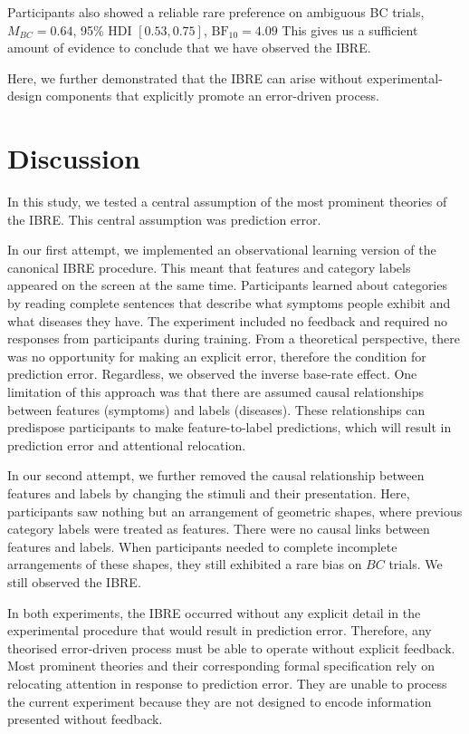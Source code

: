 \documentclass[10pt,letterpaper]{article}
\begin{document}
Participants also showed a reliable rare preference on ambiguous BC trials, $M_{BC} = 0.64$, 95\% HDI $[0.53, 0.75]$, $\mathrm{BF}_{10} = 4.09$
This gives us a sufficient amount of evidence to conclude that we have observed the IBRE.

Here, we further demonstrated that the IBRE can arise without experimental-design components that explicitly promote an error-driven process.

\section{Discussion}

In this study, we tested a central assumption of the most prominent theories of the IBRE.
This central assumption was prediction error.

In our first attempt, we implemented an observational learning version of the canonical IBRE procedure.
This meant that features and category labels appeared on the screen at the same time.
Participants learned about categories by reading complete sentences that describe what symptoms people exhibit and what diseases they have.
The experiment included no feedback and required no responses from participants during training.
From a theoretical perspective, there was no opportunity for making an explicit error, therefore the condition for prediction error.
Regardless, we observed the inverse base-rate effect.
One limitation of this approach was that there are assumed causal relationships between features (symptoms) and labels (diseases).
These relationships can predispose participants to make feature-to-label predictions, which will result in prediction error and attentional relocation.

In our second attempt, we further removed the causal relationship between features and labels by changing the stimuli and their presentation.
Here, participants saw nothing but an arrangement of geometric shapes, where previous category labels were treated as features.
There were no causal links between features and labels.
When participants needed to complete incomplete arrangements of these shapes, they still exhibited a rare bias on $BC$ trials.
We still observed the IBRE.

In both experiments, the IBRE occurred without any explicit detail in the experimental procedure that would result in prediction error.
Therefore, any theorised error-driven process must be able to operate without explicit feedback.
Most prominent theories and their corresponding formal specification rely on relocating attention in response to prediction error.
They are unable to process the current experiment because they are not designed to encode information presented without feedback.
\end{document}
